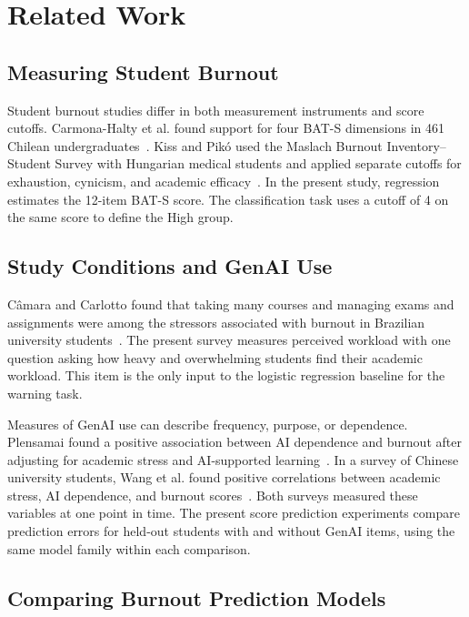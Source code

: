 \section{Related Work}
\label{sec:related-work}

\subsection{Measuring Student Burnout}

Student burnout studies differ in both measurement instruments and score cutoffs. Carmona-Halty et al. found support for four BAT-S dimensions in 461 Chilean undergraduates~\cite{carmonahalty2024bats}. Kiss and Pik\'{o} used the Maslach Burnout Inventory--Student Survey with Hungarian medical students and applied separate cutoffs for exhaustion, cynicism, and academic efficacy~\cite{kiss2025burnout}. In the present study, regression estimates the 12-item BAT-S score. The classification task uses a cutoff of 4 on the same score to define the High group.

\subsection{Study Conditions and GenAI Use}

C\^{a}mara and Carlotto found that taking many courses and managing exams and assignments were among the stressors associated with burnout in Brazilian university students~\cite{camara2024stressors}. The present survey measures perceived workload with one question asking how heavy and overwhelming students find their academic workload. This item is the only input to the logistic regression baseline for the warning task.

Measures of GenAI use can describe frequency, purpose, or dependence. Plensamai found a positive association between AI dependence and burnout after adjusting for academic stress and AI-supported learning~\cite{plensamai2026burnout}. In a survey of Chinese university students, Wang et al. found positive correlations between academic stress, AI dependence, and burnout scores~\cite{wang2026offloading}. Both surveys measured these variables at one point in time. The present score prediction experiments compare prediction errors for held-out students with and without GenAI items, using the same model family within each comparison.

\subsection{Comparing Burnout Prediction Models}

